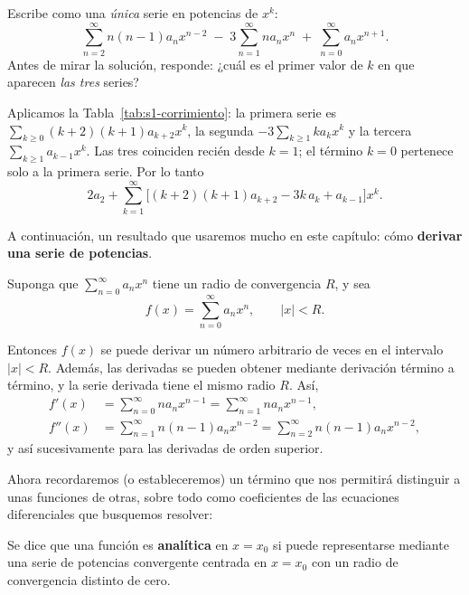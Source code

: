 \begin{activity}
Escribe como una \emph{única} serie en potencias de $x^k$:
\[ \sum_{n=2}^{\infty} n(n-1)a_n x^{n-2} \;-\; 3\sum_{n=1}^{\infty} n a_n x^{n} \;+\; \sum_{n=0}^{\infty} a_n x^{n+1}. \]
Antes de mirar la solución, responde: ¿cuál es el primer valor de $k$ en que aparecen \emph{las tres} series?
\end{activity}
 
\begin{solution}
Aplicamos la Tabla~\ref{tab:s1-corrimiento}: la primera serie es $\sum_{k\ge 0}(k+2)(k+1)a_{k+2}x^k$, la segunda $-3\sum_{k\ge 1} k a_k x^k$ y la tercera $\sum_{k\ge 1} a_{k-1}x^k$. Las tres coinciden recién desde $k=1$; el término $k=0$ pertenece solo a la primera serie. Por lo tanto
\[ 2a_2 + \sum_{k=1}^{\infty}\bigl[(k+2)(k+1)a_{k+2}-3k\,a_k+a_{k-1}\bigr]x^k . \]
\end{solution}
 
A continuación, un resultado que usaremos mucho en este capítulo: cómo \textbf{derivar una serie de potencias}.
 
\begin{theorem}
Suponga que $\sum_{n=0}^{\infty} a_n x^n$ tiene un radio de convergencia $R$, y sea
\[ f(x) = \sum_{n=0}^{\infty} a_n x^n, \qquad |x| < R. \]
 
Entonces $f(x)$ se puede derivar un número arbitrario de veces en el intervalo $|x| < R$. Además, las derivadas se pueden obtener mediante derivación término a término, y la serie derivada tiene el mismo radio $R$. Así,
\begin{align*}
f'(x) &= \sum_{n=0}^{\infty} n a_n x^{n-1} = \sum_{n=1}^{\infty} n a_n x^{n-1}, \\
f''(x) &= \sum_{n=1}^{\infty} n(n-1)a_n x^{n-2} = \sum_{n=2}^{\infty} n(n-1)a_n x^{n-2},
\end{align*}
y así sucesivamente para las derivadas de orden superior.
\end{theorem}
 
Ahora recordaremos (o estableceremos) un término que nos permitirá distinguir a unas funciones de otras, sobre todo como coeficientes de las ecuaciones diferenciales que busquemos resolver:
 
\begin{definition}
    Se dice que una función es \textbf{analítica} en $x = x_0$ si puede representarse mediante una serie de potencias convergente centrada en $x = x_0$ con un radio de convergencia distinto de cero.
\end{definition}
 
